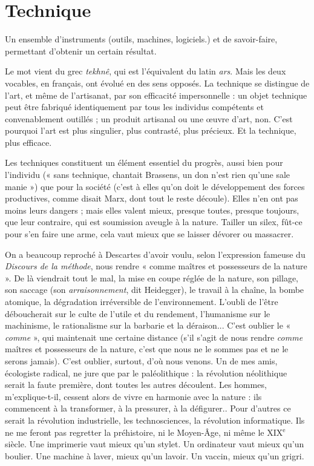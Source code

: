 \section{Technique}
Un ensemble d'instruments (outils, machines, logiciels.) et
de savoir-faire, permettant d’obtenir un certain résultat.

Le mot vient du grec {\it tekhnê}, qui est l’équivalent du latin {\it ars}. Mais les deux
vocables, en français, ont évolué en des sens opposés. La technique se distingue
de l’art, et même de l’artisanat, par son efficacité impersonnelle : un objet technique
peut être fabriqué identiquement par tous les individus compétents et
convenablement outillés ; un produit artisanal ou une œuvre d’art, non. C’est
pourquoi l’art est plus singulier, plus contrasté, plus précieux. Et la technique,
plus efficace.

Les techniques constituent un élément essentiel du progrès, aussi bien pour
l'individu (« sans technique, chantait Brassens, un don n’est rien qu’une sale
manie ») que pour la société (c’est à elles qu’on doit le développement des
forces productives, comme disait Marx, dont tout le reste découle). Elles n’en
ont pas moins leurs dangers ; mais elles valent mieux, presque toutes, presque
toujours, que leur contraire, qui est soumission aveugle à la nature. Tailler un
silex, fût-ce pour s’en faire une arme, cela vaut mieux que se laisser dévorer ou
massacrer.

On a beaucoup reproché à Descartes d’avoir voulu, selon l'expression
fameuse du {\it Discours de la méthode}, nous rendre « comme maîtres et possesseurs
de la nature ». De là viendrait tout le mal, la mise en coupe réglée de la nature,
son pillage, son saccage (son {\it arraisonnement}, dit Heidegger), le travail à la
chaîne, la bombe atomique, la dégradation irréversible de l’environnement.
L’oubli de l’être déboucherait sur le culte de l'utile et du rendement, l’humanisme
sur le machinisme, le rationalisme sur la barbarie et la déraison... C’est
oublier le « {\it comme} », qui maintenait une certaine distance (s’il s’agit de nous
rendre {\it comme} maîtres et possesseurs de la nature, c’est que nous ne le sommes
pas et ne le serons jamais). C’est oublier, surtout, d’où nous venons. Un de mes
amis, écologiste radical, ne jure que par le paléolithique : la révolution néolithique
serait la faute première, dont toutes les autres découlent. Les hommes,
m’explique-t-il, cessent alors de vivre en harmonie avec la nature : ils commencent
à la transformer, à la pressurer, à la défigurer.. Pour d’autres ce serait la
révolution industrielle, les technosciences, la révolution informatique. Ils ne
me feront pas regretter la préhistoire, ni le Moyen-Âge, ni même le {\footnotesize XIX$^\text{e}$} siècle.
Une imprimerie vaut mieux qu’un stylet. Un ordinateur vaut mieux qu’un
boulier. Une machine à laver, mieux qu’un lavoir. Un vaccin, mieux qu’un
grigri.

